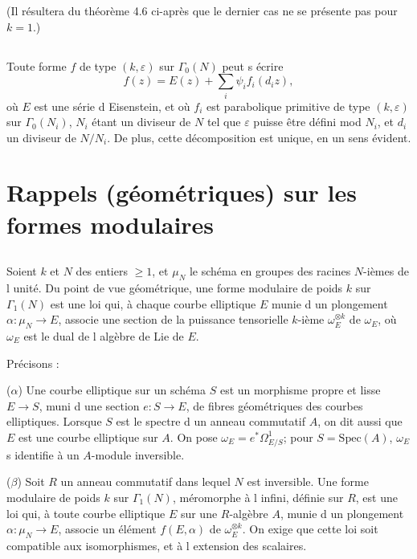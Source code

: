 \documentclass[11pt]{amsart}
\theoremstyle{plain}
\theoremstyle{definition}
\theoremstyle{remark}
\begin{document}
(Il résultera du théorème 4.6 ci-après que le dernier cas ne se présente pas pour $k = 1$.)

\subsection{}

Toute forme $f$ de type $(k,\varepsilon)$ sur $\Gamma_0(N)$ peut s écrire
$$
f(z) = E(z) + \sum_i \psi_i f_i(d_i z),
$$
où $E$ est une série d Eisenstein, et où $f_i$ est parabolique primitive de type $(k, \varepsilon)$ sur $\Gamma_0(N_i)$,
$N_i$ étant un diviseur de $N$ tel que $\varepsilon$ puisse être défini mod $N_i$, et $d_i$ un diviseur de $N/N_i$.
De plus, cette décomposition est unique, en un sens évident.

\section{Rappels (géométriques) sur les formes modulaires}

\subsection{}

Soient $k$ et $N$ des entiers $\ge 1$, et $\mu_N$ le schéma en groupes des racines $N$-ièmes de l unité. Du point de vue géométrique, une forme modulaire de poids $k$ sur $\Gamma_1(N)$ est une loi qui, à chaque courbe elliptique $E$ munie d un plongement $\alpha : \mu_N \to E$, associe une section de la puissance tensorielle $k$-ième $\omega_E^{\otimes k}$ de $\omega_E$, où $\omega_E$ est le dual de l algèbre de Lie de $E$.

Précisons :

($\alpha$) Une courbe elliptique sur un schéma $S$ est un morphisme propre et lisse $E \to S$, muni d une section $e : S \to E$, de fibres géométriques des courbes elliptiques. Lorsque $S$ est le spectre d un anneau commutatif $A$, on dit aussi que $E$ est une courbe elliptique sur $A$. On pose $\omega_E = e^* \Omega^1_{E/S}$; pour $S = \mathrm{Spec}(A)$, $\omega_E$ s identifie à un $A$-module inversible.

($\beta$) Soit $R$ un anneau commutatif dans lequel $N$ est inversible. Une forme modulaire de poids $k$ sur $\Gamma_1(N)$, méromorphe à l infini, définie sur $R$, est une loi qui, à toute courbe elliptique $E$ sur une $R$-algèbre $A$, munie d un plongement $\alpha : \mu_N \to E$, associe un élément $f(E,\alpha)$ de $\omega_E^{\otimes k}$. On exige que cette loi soit compatible aux isomorphismes, et à l extension des scalaires.
\end{document}
